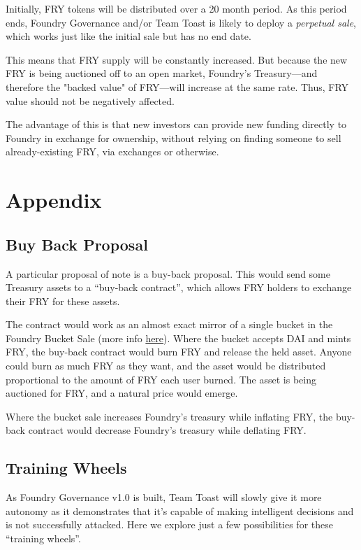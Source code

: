 \documentclass{article}
\begin{document}
Initially, FRY tokens will be distributed over a 20 month period. As this period ends, Foundry Governance and/or Team Toast is likely to deploy a \textit{perpetual sale}, which works just like the initial sale but has no end date.

This means that FRY supply will be constantly increased. But because the new FRY is being auctioned off to an open market, Foundry's Treasury---and therefore the "backed value" of FRY---will increase at the same rate. Thus, FRY value should not be negatively affected.

The advantage of this is that new investors can provide new funding directly to Foundry in exchange for ownership, without relying on finding someone to sell already-existing FRY, via exchanges or otherwise.

\section{Appendix} \label{appendix}

\subsection{Buy Back Proposal} \label{buy-back}

A particular proposal of note is a buy-back proposal. This would send some Treasury assets to a ``buy-back contract'', which allows FRY holders to exchange their FRY for these assets.

The contract would work as an almost exact mirror of a single bucket in the Foundry Bucket Sale (more info \href{https://foundrydao.com/faq/#about-the-token-sale}{here}). Where the bucket accepts DAI and mints FRY, the buy-back contract would burn FRY and release the held asset. Anyone could burn as much FRY as they want, and the asset would be distributed proportional to the amount of FRY each user burned. The asset is being auctioned for FRY, and a natural price would emerge.

Where the bucket sale increases Foundry's treasury while inflating FRY, the buy-back contract would decrease Foundry's treasury while deflating FRY.

\subsection{Training Wheels} \label{training-wheels}

As Foundry Governance v1.0 is built, Team Toast will slowly give it more autonomy as it demonstrates that it's capable of making intelligent decisions and is not successfully attacked. Here we explore just a few possibilities for these ``training wheels''.
\end{document}
